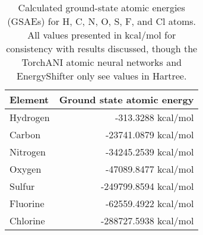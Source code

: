 \begin{table}[hb!]
\label{tbl:GSAEs}
\center 
    \caption[$\omega$B97X ground-state atomic energies used in ANI-2xr]{Calculated ground-state atomic energies (GSAEs) for H, C, N, O, S, F, and Cl atoms. All values presented in kcal/mol for consistency with results discussed, though the TorchANI atomic neural networks and EnergyShifter only see values in Hartree.}
    \begin{tabular}{l r}
    \toprule
    Element & Ground state atomic energy \\
    \midrule
    Hydrogen & -313.3288 kcal/mol \\
    Carbon & -23741.0879 kcal/mol \\
    Nitrogen & -34245.2539 kcal/mol \\
    Oxygen & -47089.8477 kcal/mol \\
    Sulfur & -249799.8594 kcal/mol \\
    Fluorine & -62559.4922 kcal/mol \\
    Chlorine & -288727.5938 kcal/mol \\
    \bottomrule
    \end{tabular}
\end{table}



